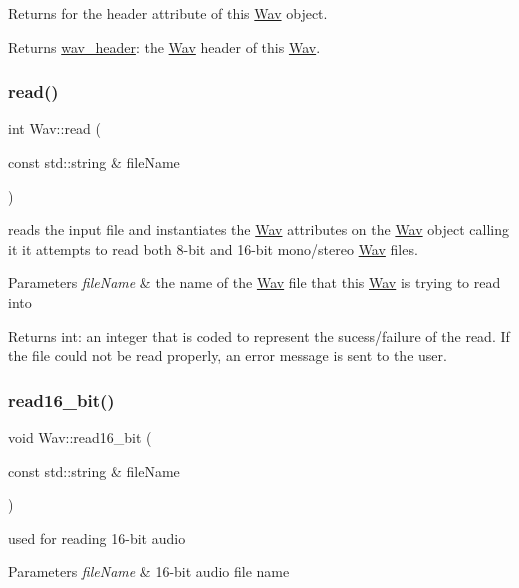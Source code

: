 Returns for the header attribute of this \hyperlink{classWav}{Wav} object. \begin{DoxyReturn}{Returns}
\hyperlink{structwav__header}{wav\+\_\+header}\+: the \hyperlink{classWav}{Wav} header of this \hyperlink{classWav}{Wav}. 
\end{DoxyReturn}
\mbox{\label{classWav_ab041ca7da4c04d795aa5286a920fb08a}} 
\subsubsection{\texorpdfstring{read()}{read()}}
{\footnotesize\ttfamily int Wav\+::read (\begin{DoxyParamCaption}\item[{const std\+::string \&}]{file\+Name }\end{DoxyParamCaption})}

reads the input file and instantiates the \hyperlink{classWav}{Wav} attributes on the \hyperlink{classWav}{Wav} object calling it it attempts to read both 8-\/bit and 16-\/bit mono/stereo \hyperlink{classWav}{Wav} files. 
\begin{DoxyParams}{Parameters}
{\em file\+Name} & the name of the \hyperlink{classWav}{Wav} file that this \hyperlink{classWav}{Wav} is trying to read into \\
\hline
\end{DoxyParams}
\begin{DoxyReturn}{Returns}
int\+: an integer that is coded to represent the sucess/failure of the read. If the file could not be read properly, an error message is sent to the user. 
\end{DoxyReturn}
\mbox{\label{classWav_a6c081bff6b89f578ed1d5529536c8324}} 
\subsubsection{\texorpdfstring{read16\+\_\+bit()}{read16\_bit()}}
{\footnotesize\ttfamily void Wav\+::read16\+\_\+bit (\begin{DoxyParamCaption}\item[{const std\+::string \&}]{file\+Name }\end{DoxyParamCaption})}

used for reading 16-\/bit audio 
\begin{DoxyParams}{Parameters}
{\em file\+Name} & 16-\/bit audio file name \\
\hline
\end{DoxyParams}
\mbox{\label{classWav_aae25e05765875439d7817d1e4faf15cd}} 
